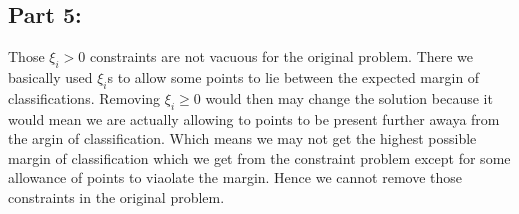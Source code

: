\documentclass[a4paper,11pt]{article}
\begin{document}
\begin{mlsolution}
\subsection*{Part 5:}
Those $\xi_i > 0$ constraints are not vacuous for the original problem. There we basically used $\xi_i$s to allow some points to lie between the expected margin of classifications. 
Removing $\xi_i \geq 0$ would then may change the solution because it would mean we  are actually allowing to points to be present further awaya from the argin of classification. Which means we may not get the highest possible margin of classification  which we get from the constraint problem except for some allowance of points to viaolate the margin. Hence we cannot remove those constraints in the original problem.
\end{mlsolution}
\end{document}
